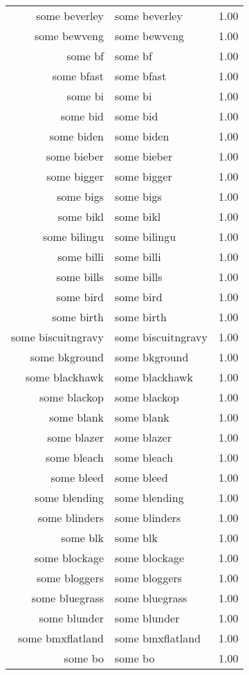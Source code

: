 \begin{table}[ht]
\begin{tabular}{rlr}
  some beverley & some beverley & 1.00 \\ 
  some bewveng & some bewveng & 1.00 \\ 
  some bf & some bf & 1.00 \\ 
  some bfast & some bfast & 1.00 \\ 
  some bi & some bi & 1.00 \\ 
  some bid & some bid & 1.00 \\ 
  some biden & some biden & 1.00 \\ 
  some bieber & some bieber & 1.00 \\ 
  some bigger & some bigger & 1.00 \\ 
  some bigs & some bigs & 1.00 \\ 
  some bikl & some bikl & 1.00 \\ 
  some bilingu & some bilingu & 1.00 \\ 
  some billi & some billi & 1.00 \\ 
  some bills & some bills & 1.00 \\ 
  some bird & some bird & 1.00 \\ 
  some birth & some birth & 1.00 \\ 
  some biscuitngravy & some biscuitngravy & 1.00 \\ 
  some bkground & some bkground & 1.00 \\ 
  some blackhawk & some blackhawk & 1.00 \\ 
  some blackop & some blackop & 1.00 \\ 
  some blank & some blank & 1.00 \\ 
  some blazer & some blazer & 1.00 \\ 
  some bleach & some bleach & 1.00 \\ 
  some bleed & some bleed & 1.00 \\ 
  some blending & some blending & 1.00 \\ 
  some blinders & some blinders & 1.00 \\ 
  some blk & some blk & 1.00 \\ 
  some blockage & some blockage & 1.00 \\ 
  some bloggers & some bloggers & 1.00 \\ 
  some bluegrass & some bluegrass & 1.00 \\ 
  some blunder & some blunder & 1.00 \\ 
  some bmxflatland & some bmxflatland & 1.00 \\ 
  some bo & some bo & 1.00 \\ 

\end{tabular}
\end{table}
